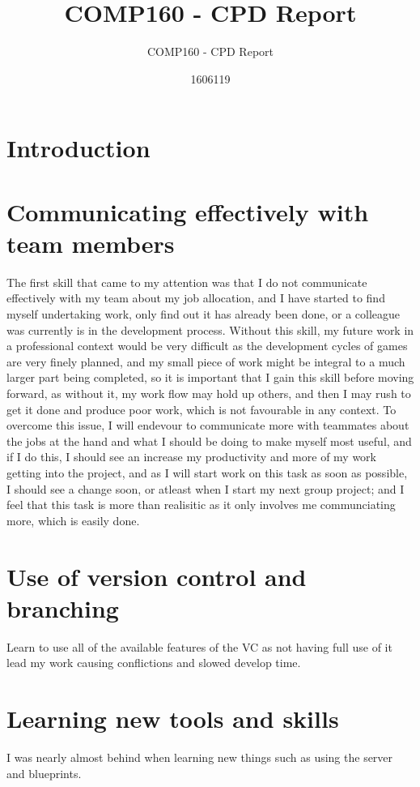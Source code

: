 \documentclass{scrartcl}
\title{COMP160 - CPD Report}
\subtitle{COMP160 - CPD Report}
\author{1606119}
\begin{document}
\maketitle

\section{Introduction}



\section{Communicating effectively with team members}
The first skill that came to my attention was that I do not communicate effectively with my team about my job allocation, and I have started to find myself undertaking work, only find out it has already been done, or a colleague was currently is in the development process. Without this skill, my future work in a professional context would be very difficult as the development cycles of games are very finely planned, and my small piece of work might be integral to a much larger part being completed, so it is important that I gain this skill before moving forward, as without it, my work flow may hold up others, and then I may rush to get it done and produce poor work, which is not favourable in any context. To overcome this issue, I will endevour to communicate more with teammates about the jobs at the hand and what I should be doing to make myself most useful, and if I do this, I should see an increase my productivity and more of my work getting into the project, and as I will start work on this task as soon as possible, I should see a change soon, or atleast when I start my next group project; and I feel that this task is more than realisitic as it only involves me communciating more, which is easily done. 

\section{Use of version control and branching}
Learn to use all of the available features of the VC as not having full use of it lead my work causing conflictions and slowed develop time. 


\section{Learning new tools and skills}
I was nearly almost behind when learning new things such as using the server and blueprints. 
\end{document}
